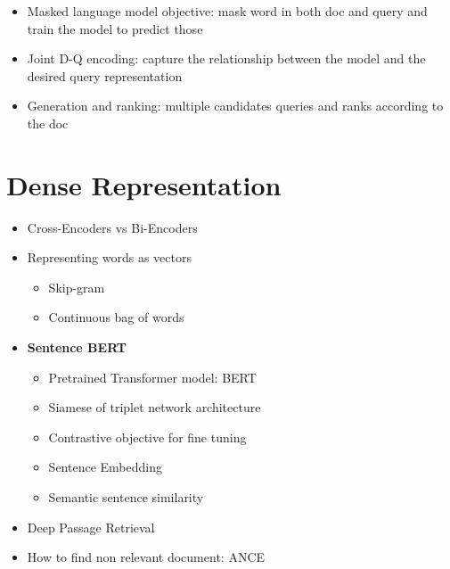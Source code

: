 \documentclass[12pt,oneside]{report}
\begin{document}
\begin{itemize}
\begin{itemize}
\begin{itemize}
\begin{itemize}
                \item Masked language model objective: mask word in both doc and query and train the model to predict those
                \item Joint D-Q encoding: capture the relationship between the model and the desired query representation
                \item Generation and ranking: multiple candidates queries and ranks according to the doc
            \end{itemize}
        \end{itemize}
    \end{itemize}
\end{itemize}

\section{Dense Representation}
\begin{itemize}
    \item Cross-Encoders vs Bi-Encoders
    \item Representing words as vectors
    \begin{itemize}
        \item Skip-gram
        \item Continuous bag of words
    \end{itemize}
    \item \textbf{Sentence BERT}
    \begin{itemize}
        \item Pretrained Transformer model: BERT
        \item Siamese of triplet network architecture
        \item Contrastive objective for fine tuning
        \item Sentence Embedding
        \item Semantic sentence similarity
    \end{itemize}
    \item Deep Passage Retrieval
    \item How to find non relevant document: ANCE
\end{itemize}
\end{document}
